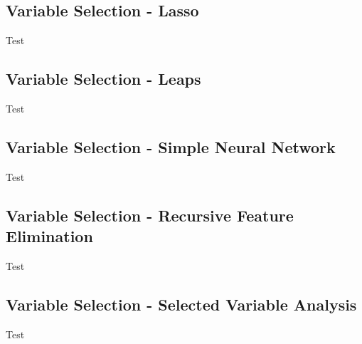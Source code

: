 \subsection{Variable Selection - Lasso}
Test

\subsection{Variable Selection - Leaps}
Test

\subsection{Variable Selection - Simple Neural Network}
Test

\subsection{Variable Selection - Recursive Feature Elimination}
Test

\subsection{Variable Selection - Selected Variable Analysis}
Test